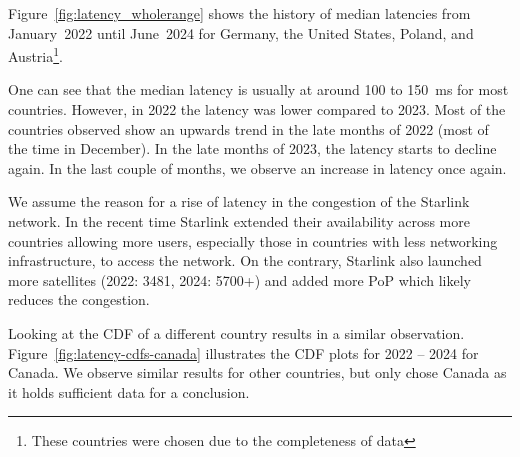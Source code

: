 Figure~\ref{fig:latency_wholerange} shows the history of median latencies from January~2022 until June~2024 for Germany, the United States, Poland, and Austria\footnote{These countries were chosen due to the completeness of data}.

One can see that the median latency is usually at around 100 to 150~ms for most countries. However, in 2022 the latency was lower compared to 2023. Most of the countries observed show an upwards trend in the late months of 2022 (most of the time in December). In the late months of 2023, the latency starts to decline again. In the last couple of months, we observe an increase in latency once again.

We assume the reason for a rise of latency in the congestion of the Starlink network. In the recent time Starlink extended their availability across more countries allowing more users, especially those in countries with less networking infrastructure, to access the network.
On the contrary, Starlink also launched more satellites (2022: 3481, 2024: 5700+) and added more \ac{PoP} which likely reduces the congestion.

Looking at the CDF of a different country results in a similar observation. Figure~\ref{fig:latency-cdfs-canada} illustrates the CDF plots for 2022 -- 2024 for Canada. We observe similar results for other countries, but only chose Canada as it holds sufficient data for a conclusion.

